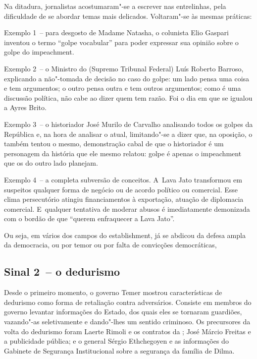 Na ditadura, jornalistas acostumaram"-se a escrever nas entrelinhas, pela
dificuldade de se abordar temas mais delicados. Voltaram"-se às mesmas
práticas:

Exemplo 1~-- para desgosto de Madame Natasha, o colunista Elio Gaspari
inventou o termo ``golpe vocabular'' para poder expressar sua opinião
sobre o golpe do impeachment.

Exemplo 2~-- o Ministro do  (Supremo Tribunal Federal) Luís Roberto
Barroso, explicando a não"-tomada de decisão no caso do golpe: um lado
pensa uma coisa e tem argumentos; o outro pensa outra e tem outros
argumentos; como é uma discussão política, não cabe ao  dizer quem
tem razão. Foi o dia em que se igualou a Ayres Brito.

Exemplo 3~-- o historiador José Murilo de Carvalho analisando todos os
golpes da República e, na hora de analisar o atual, limitando"-se a dizer
que, na oposição, o  também tentou o mesmo, demonstração cabal de que
o historiador é um personagem da história que ele mesmo relatou: golpe é
apenas o impeachment que os do outro lado planejam.

Exemplo 4~-- a completa subversão de conceitos. A~Lava Jato transformou
em suspeitos qualquer forma de negócio ou de acordo político ou
comercial. Esse clima persecutório atingiu financiamentos à exportação,
atuação de diplomacia comercial. E~qualquer tentativa de moderar abusos
é imediatamente demonizada com o bordão de que ``querem enfraquecer a
Lava Jato''.

Ou seja, em vários dos campos do establishment, já se abdicou da defesa
ampla da democracia, ou por temor ou por falta de convicções
democráticas,

\subsection{Sinal 2~-- o dedurismo}

Desde o primeiro momento, o governo Temer mostrou características de
dedurismo como forma de retaliação contra adversários. Consiste em
membros do governo levantar informações do Estado, dos quais eles se
tornaram guardiões, vazando"-as seletivamente e dando"-lhes um sentido
criminoso. Os precursores da volta do dedurismo foram Laerte Rimoli e os
contratos da ; José Márcio Freitas e a publicidade pública; e o
general Sérgio Ethchegoyen e as informações do Gabinete de Segurança
Institucional sobre a segurança da família de Dilma.

